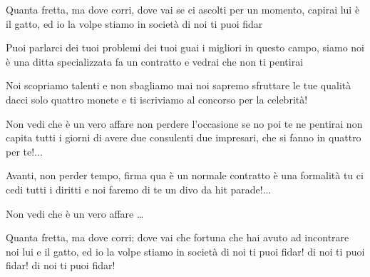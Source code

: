 
\beginverse

Quanta fretta, ma dove corri, dove vai
se ci ascolti per un momento, capirai
lui è il gatto, ed io la volpe
stiamo in società
di noi ti puoi fidar

\endverse

\chordsoff 

\beginverse

Puoi parlarci dei tuoi problemi
dei tuoi guai
i migliori in questo campo, siamo noi
è una ditta specializzata
fa un contratto e vedrai 
che non ti pentirai

\endverse

\beginverse

Noi scopriamo talenti 
e non sbagliamo mai 
noi sapremo sfruttare le tue qualità
dacci solo quattro monete 
e ti iscriviamo al concorso
per la celebrità!

\endverse

\chordson

\beginchorus

Non vedi che è un vero affare
non perdere l'occasione
se no poi te ne pentirai
non capita tutti i giorni
di avere due consulenti
due impresari, che si fanno
in quattro per te!... 

\endchorus

\chordsoff

\beginverse

Avanti, non perder tempo, firma qua
è un normale contratto è una formalità
tu ci cedi tutti i diritti
e noi faremo di te
un divo da hit parade!... 

\endverse

\beginchorus

Non vedi che è un vero affare \dots

\endchorus

\beginverse

Quanta fretta, ma dove corri; dove vai
che fortuna che hai avuto 
ad incontrare noi
lui e il gatto, ed io la volpe
stiamo in società
di noi ti puoi fidar!
di noi ti puoi fidar! 
di noi ti puoi fidar! 

\endverse

\endsong

